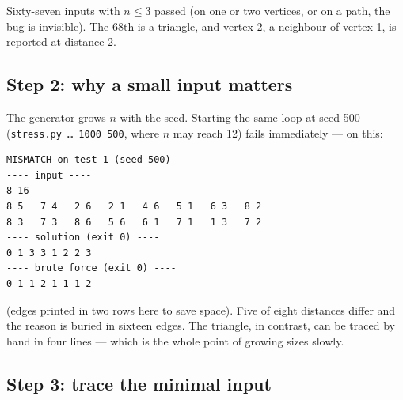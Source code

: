 Sixty-seven inputs with $n \le 3$ passed (on one or two vertices, or on a path, the bug is invisible). The 68th is a triangle, and vertex 2, a neighbour of vertex 1, is reported at distance 2.

\begin{diagrambox}
\end{diagrambox}

\subsection*{Step 2: why a small input matters}

The generator grows $n$ with the seed. Starting the same loop at seed 500 (\texttt{stress.py \ldots{} 1000 500}, where $n$ may reach 12) fails immediately --- on this:

\begin{lstlisting}[style=trace]
MISMATCH on test 1 (seed 500)
---- input ----
8 16
8 5   7 4   2 6   2 1   4 6   5 1   6 3   8 2
8 3   7 3   8 6   5 6   6 1   7 1   1 3   7 2
---- solution (exit 0) ----
0 1 3 3 1 2 2 3
---- brute force (exit 0) ----
0 1 1 2 1 1 1 2
\end{lstlisting}

(edges printed in two rows here to save space). Five of eight distances differ and the reason is buried in sixteen edges. The triangle, in contrast, can be traced by hand in four lines --- which is the whole point of growing sizes slowly.

\subsection*{Step 3: trace the minimal input}

